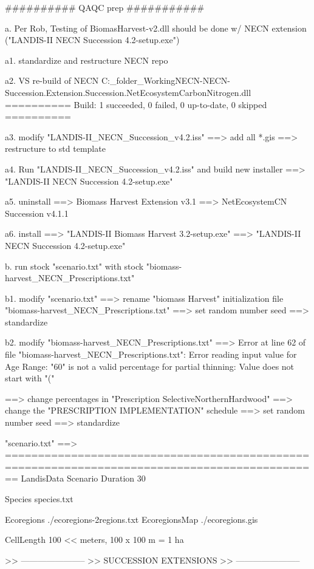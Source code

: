 ##########
QAQC prep 
###########

	a. Per Rob, Testing of BiomasHarvest-v2.dll should be done
	  w/ NECN extension ("LANDIS-II NECN Succession 4.2-setup.exe")


	a1. standardize and restructure NECN repo


	a2. VS re-build of NECN
C:\Users\bmarr\Desktop\New_folder_WorkingNECN\Extension-NECN-Succession\src\bin\debug\Landis.Extension.Succession.NetEcosystemCarbonNitrogen.dll
========== Build: 1 succeeded, 0 failed, 0 up-to-date, 0 skipped ==========


	a3. modify "LANDIS-II_NECN_Succession_v4.2.iss"
		==> add all *.gis
		==> restructure to std template


	a4. Run "LANDIS-II_NECN_Succession_v4.2.iss" and build new installer
		==> "LANDIS-II NECN Succession 4.2-setup.exe"


	a5. uninstall 
		==> Biomass Harvest Extension v3.1
		==> NetEcosystemCN Succession v4.1.1


	a6. install
		==> "LANDIS-II Biomass Harvest 3.2-setup.exe"
		==> "LANDIS-II NECN Succession 4.2-setup.exe"



	b. run stock "scenario.txt" with stock "biomass-harvest_NECN_Prescriptions.txt"

	b1. modify "scenario.txt"
		==> rename "biomass Harvest" initialization file
		    "biomass-harvest_NECN_Prescriptions.txt"
		==> set random number seed
		==> standardize


	b2. modify "biomass-harvest_NECN_Prescriptions.txt"
		==> Error at line 62 of file "biomass-harvest_NECN_Prescriptions.txt":
  		    Error reading input value for Age Range:
    		    "60" is not a valid percentage for partial thinning:
      		    Value does not start with "("

		==> change percentages in "Prescription SelectiveNorthernHardwood"
		==> change the "PRESCRIPTION IMPLEMENTATION" schedule
		==> set random number seed
		==> standardize


"scenario.txt" ==>
==============================================================================================
LandisData  Scenario
Duration  30

Species   species.txt

Ecoregions      ./ecoregions-2regions.txt
EcoregionsMap   ./ecoregions.gis

CellLength  100 << meters, 100 x 100 m = 1 ha


>> -----------------------
>> SUCCESSION EXTENSIONS
>> -----------------------

